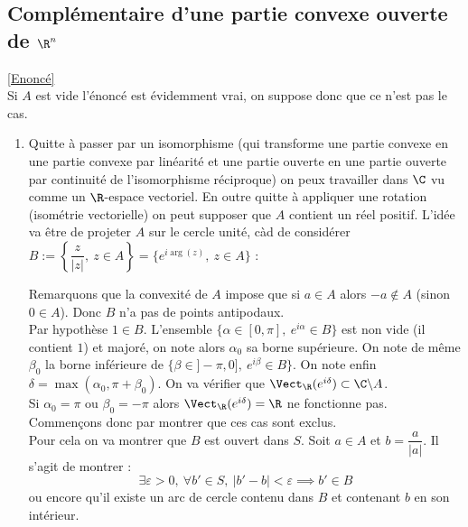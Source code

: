 \documentclass{book}
\begin{document}
	\subsection{Complémentaire d'une partie convexe ouverte de $\R^n$ }
	\label{Complémentaire d'une partie convexe ouverte de R^n corrigé}
	\textcolor{blue}{\hyperref[Complémentaire d'une partie convexe ouverte de R^n]{[Enoncé]}}\\
	Si $A$ est vide l'énoncé est évidemment vrai, on suppose donc que ce n'est pas le cas.
	\begin{enumerate}
		\item Quitte à passer par un isomorphisme (qui transforme une partie convexe en une partie convexe par linéarité et une partie ouverte en une partie ouverte par continuité de l'isomorphisme réciproque) on peux travailler dans $\C$ vu comme un $\R$-espace vectoriel. En outre quitte à appliquer une rotation (isométrie vectorielle) on peut supposer que $A$ contient un réel positif. L'idée va être de projeter $A$ sur le cercle unité, càd de considérer $B:=\left\{\dfrac{z}{|z|},\ z\in A\right\}=\{e^{i\arg(z)},\ z\in A\}$ :\\
		\begin{center}
		\end{center}
		Remarquons que la convexité de $A$ impose que si $a\in A$ alors $-a\notin A$ (sinon $0\in A$). Donc $B$ n'a pas de points antipodaux.\\
		Par hypothèse $1\in B$. L'ensemble $\{\alpha\in [0,\pi],\ e^{i\alpha}\in B\}$ est non vide (il contient $1$) et majoré, on note alors $\alpha_0$ sa borne supérieure. On note de même $\beta_0$ la borne inférieure de $\{\beta\in ]-\pi,0],\ e^{i\beta}\in B\}$. On note enfin $\delta=\max(\alpha_0,\pi+\beta_0)$. On va vérifier que $\Vect_\R(e^{i\delta })\subset \C\backslash A$.\\
		Si $\alpha_0=\pi$ ou $\beta_0=-\pi$ alors $\Vect_\R(e^{i\delta})=\R$ ne fonctionne pas. Commençons donc par montrer que ces cas sont exclus.\\
		Pour cela on va montrer que $B$ est ouvert dans $S$. Soit $a\in A$ et $b=\dfrac{a}{|a|}$. Il s'agit de montrer :
		$$\exists\varepsilon>0,\ \forall b'\in S,\ |b'-b|<\varepsilon\implies b'\in B$$
		ou encore qu'il existe un arc de cercle contenu dans $B$ et contenant $b$ en son intérieur.\\

\end{enumerate}
\end{document}
